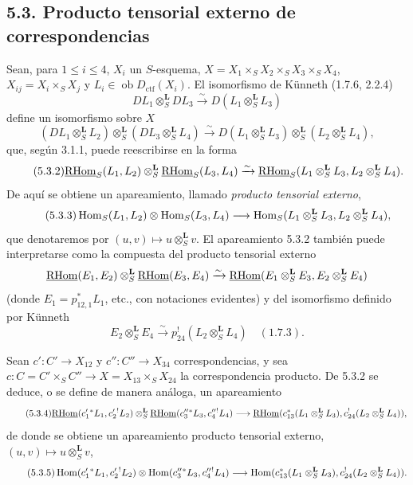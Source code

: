 \subsection*{5.3. Producto tensorial externo de correspondencias}

Sean, para $1\leq i\leq 4$, $X_i$ un $S$-esquema, $X=X_1\times_SX_2\times_SX_3\times_SX_4$, $X_{ij}=X_i\times_SX_j$ y $L_i\in\operatorname{ob}D_{\mathrm{ctf}}(X_i)$. El isomorfismo de Künneth (1.7.6, 2.2.4)
\[
DL_1\otimes_S^{\mathbf L}DL_3\xrightarrow{\sim}D(L_1\otimes_S^{\mathbf L}L_3)
\]
define un isomorfismo sobre $X$
\begin{equation}
\tag{5.3.1}
(DL_1\otimes_S^{\mathbf L}L_2)\otimes_S^{\mathbf L}(DL_3\otimes_S^{\mathbf L}L_4)
\xrightarrow{\sim}D(L_1\otimes_S^{\mathbf L}L_3)\otimes_S^{\mathbf L}(L_2\otimes_S^{\mathbf L}L_4),
\end{equation}
que, según 3.1.1, puede reescribirse en la forma
\begin{equation}
\tag{5.3.2}
\underline{\mathrm{RHom}}_S(L_1,L_2)\otimes_S^{\mathbf L}\underline{\mathrm{RHom}}_S(L_3,L_4)
\xrightarrow{\sim}\underline{\mathrm{RHom}}_S(L_1\otimes_S^{\mathbf L}L_3,L_2\otimes_S^{\mathbf L}L_4).
\end{equation}
De aquí se obtiene un apareamiento, llamado \emph{producto tensorial externo},
\begin{equation}
\tag{5.3.3}
\operatorname{Hom}_S(L_1,L_2)\otimes\operatorname{Hom}_S(L_3,L_4)
\longrightarrow\operatorname{Hom}_S(L_1\otimes_S^{\mathbf L}L_3,L_2\otimes_S^{\mathbf L}L_4),
\end{equation}
que denotaremos por $(u,v)\mapsto u\otimes_S^{\mathbf L}v$. El apareamiento 5.3.2 también puede interpretarse como la compuesta del producto tensorial externo
\[
\underline{\mathrm{RHom}}(E_1,E_2)\otimes_S^{\mathbf L}\underline{\mathrm{RHom}}(E_3,E_4)
\xrightarrow{\sim}\underline{\mathrm{RHom}}(E_1\otimes_S^{\mathbf L}E_3,E_2\otimes_S^{\mathbf L}E_4)
\]
(donde $E_1=p_{12,1}^*L_1$, etc., con notaciones evidentes) y del isomorfismo definido por Künneth
\[
E_2\otimes_S^{\mathbf L}E_4\xrightarrow{\sim}p_{24}^!(L_2\otimes_S^{\mathbf L}L_4)\quad (1.7.3).
\]

Sean $c':C'\to X_{12}$ y $c'':C''\to X_{34}$ correspondencias, y sea $c:C=C'\times_SC''\to X=X_{13}\times_SX_{24}$ la correspondencia producto. De 5.3.2 se deduce, o se define de manera análoga, un apareamiento
\begin{equation}
\tag{5.3.4}
\underline{\mathrm{RHom}}(c_1'{}^*L_1,c_2'{}^!L_2)\otimes_S^{\mathbf L}\underline{\mathrm{RHom}}(c_3''{}^*L_3,c_4''{}^!L_4)
\longrightarrow\underline{\mathrm{RHom}}(c_{13}^*(L_1\otimes_S^{\mathbf L}L_3),c_{24}^!(L_2\otimes_S^{\mathbf L}L_4)),
\end{equation}
de donde se obtiene un apareamiento producto tensorial externo, $(u,v)\mapsto u\otimes_S^{\mathbf L}v$,
\begin{equation}
\tag{5.3.5}
\operatorname{Hom}(c_1'{}^*L_1,c_2'{}^!L_2)\otimes\operatorname{Hom}(c_3''{}^*L_3,c_4''{}^!L_4)
\longrightarrow\operatorname{Hom}(c_{13}^*(L_1\otimes_S^{\mathbf L}L_3),c_{24}^!(L_2\otimes_S^{\mathbf L}L_4)).
\end{equation}

